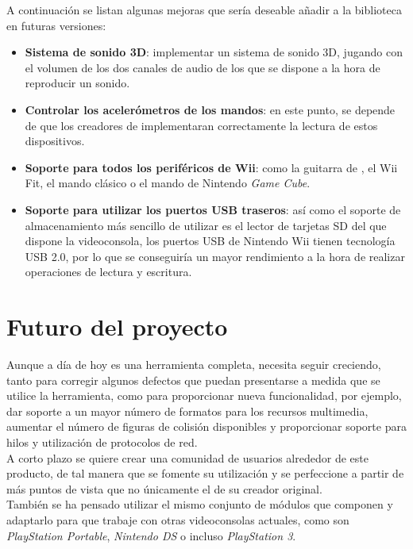 A continuación se listan algunas mejoras que sería deseable añadir a la biblioteca en futuras versiones:

\begin{itemize}
\item \textbf{Sistema de sonido 3D}: implementar un sistema de sonido 3D, jugando con el volumen de los dos canales de audio de los que se dispone a la hora de reproducir un sonido.
\item \textbf{Controlar los acelerómetros de los mandos}: en este punto, se depende de que los creadores de  implementaran correctamente la lectura de estos dispositivos.
\item \textbf{Soporte para todos los periféricos de Wii}: como la guitarra de , el Wii Fit, el mando clásico o el mando de Nintendo \emph{Game Cube}.
\item \textbf{Soporte para utilizar los puertos USB traseros}: así como el soporte de almacenamiento más sencillo de utilizar es el lector de tarjetas SD del que dispone la videoconsola, los puertos USB de Nintendo Wii tienen tecnología USB 2.0, por lo que se conseguiría un mayor rendimiento a la hora de realizar operaciones de lectura y escritura.
\end{itemize}

\section{Futuro del proyecto}

Aunque a día de hoy es una herramienta completa,  necesita seguir creciendo, tanto para corregir algunos defectos que puedan presentarse a medida que se utilice la herramienta, como para proporcionar nueva funcionalidad, por ejemplo, dar soporte a un mayor número de formatos para los recursos multimedia, aumentar el número de figuras de colisión disponibles y proporcionar soporte para hilos y utilización de protocolos de red.\\

A corto plazo se quiere crear una comunidad de usuarios alrededor de este producto, de tal manera que se fomente su utilización y se perfeccione a partir de más puntos de vista que no únicamente el de su creador original.\\

También se ha pensado utilizar el mismo conjunto de módulos que componen  y adaptarlo para que trabaje con otras videoconsolas actuales, como son \emph{PlayStation Portable}, \emph{Nintendo DS} o incluso \emph{PlayStation 3}.
